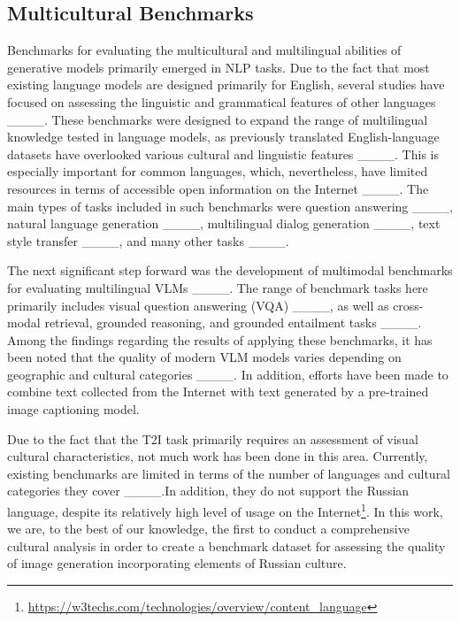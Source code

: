 \subsection{Multicultural Benchmarks}

Benchmarks for evaluating the multicultural and multilingual abilities of generative models primarily emerged in NLP tasks. Due to the fact that most existing language models are designed primarily for English, several studies have focused on assessing the linguistic and grammatical features of other languages ____. These benchmarks were designed to expand the range of multilingual knowledge tested in language models, as previously translated English-language datasets have overlooked various cultural and linguistic features ____. This is especially important for common languages, which, nevertheless, have limited resources in terms of accessible open information on the Internet ____. The main types of tasks included in such benchmarks were question answering ____, natural language generation ____, multilingual dialog generation ____, text style transfer ____, and many other tasks ____.

The next significant step forward was the development of multimodal benchmarks for evaluating multilingual VLMs ____. The range of benchmark tasks here primarily includes visual question answering (VQA) ____, as well as cross-modal retrieval, grounded reasoning, and grounded entailment tasks ____. Among the findings regarding the results of applying these benchmarks, it has been noted that the quality of modern VLM models varies depending on geographic and cultural categories ____. In addition, efforts have been made to combine text collected from the Internet with text generated by a pre-trained image captioning model.

Due to the fact that the T2I task primarily requires an assessment of visual cultural characteristics, not much work has been done in this area. Currently, existing benchmarks are limited in terms of the number of languages and cultural categories they cover ____.In addition, they do not support the Russian language, despite its relatively high level of usage on the Internet\footnote{\url{https://w3techs.com/technologies/overview/content_language}}. In this work, we are, to the best of our knowledge, the first to conduct a comprehensive cultural analysis in order to create a benchmark dataset for assessing the quality of image generation incorporating elements of Russian culture.

